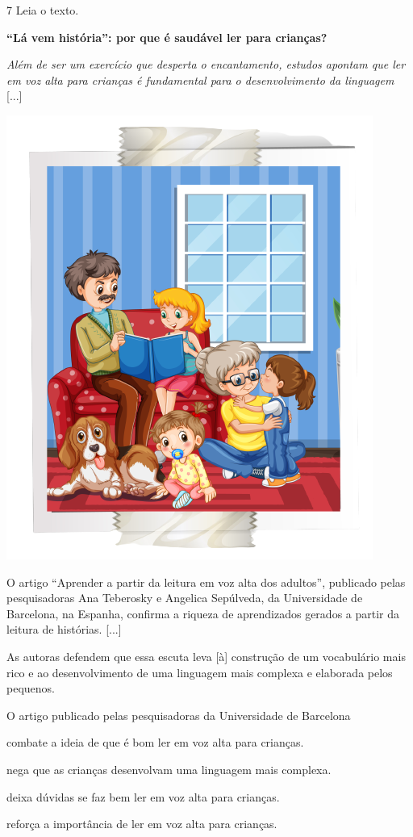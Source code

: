 \num{7} Leia o texto.

\begin{myquote}
\textbf{``Lá vem história'': por que é saudável ler para crianças?}

\emph{Além de ser um exercício que desperta o encantamento, estudos
apontam que ler em voz alta para crianças é fundamental para o
desenvolvimento da linguagem} {[}...{]}

\begin{center}
\includegraphics[width=.7\textwidth]{./media/image7a1.png}
\end{center}

O artigo ``Aprender a partir da leitura em voz alta dos adultos'',
publicado pelas pesquisadoras Ana Teberosky e Angelica Sepúlveda, da
Universidade de Barcelona, na Espanha, confirma a riqueza de
aprendizados gerados a partir da leitura de histórias. {[}...{]}

As autoras defendem que essa escuta leva {[}à{]} construção de um
vocabulário mais rico e ao desenvolvimento de uma linguagem mais
complexa e elaborada pelos pequenos.

\end{myquote}

O artigo publicado pelas pesquisadoras da Universidade de Barcelona

\begin{escolha}
\item combate a ideia de que é bom ler em voz alta para crianças.

\item nega que as crianças desenvolvam uma linguagem mais complexa.

\item deixa dúvidas se faz bem ler em voz alta para crianças.

\item reforça a importância de ler em voz alta para crianças.
\end{escolha}

